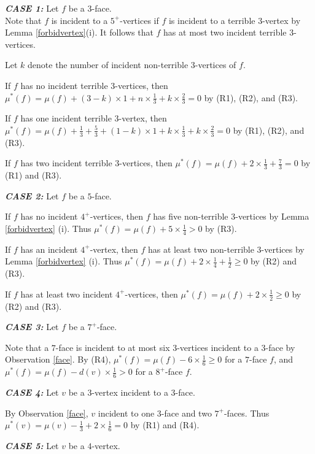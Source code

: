 \documentclass[11pt]{amsart} %
\theoremstyle{definition}
\begin{document}
\noindent\textit{\textbf{CASE 1:}} Let $f$ be a $3$-face.\\
\indent Note that $f$ is incident to a $5^+$-vertices 
if $f$ is incident to a terrible $3$-vertex 
by Lemma \ref{forbidvertex}(i). 
It follows that $f$ has at most two incident terrible $3$-vertices. 

Let $k$ denote the number of incident non-terrible 
$3$-vertices of $f.$ 

\indent  If $f$ has no incident terrible $3$-vertices,  
then $\mu^*(f)= \mu(f)+(3-k)\times1
+n\times\frac{1}{3}+k\times\frac{2}{3}=0$ 
by (R1), (R2), and (R3).

\indent  If $f$ has one incident terrible $3$-vertex,  
then $\mu^*(f)= \mu(f)+\frac{1}{3}+\frac{5}{3}+(1-k)\times1 
+k\times\frac{1}{3}+k\times\frac{2}{3}=0$ by (R1), (R2), and (R3). 

\indent  If $f$ has two incident terrible $3$-vertices,   
then $\mu^*(f)= \mu(f)+2\times\frac{1}{3}+\frac{7}{3}=0$ 
by (R1) and (R3).


\noindent\textit{\textbf{CASE 2:}} Let $f$ be a $5$-face.

\indent  If $f$ has no incident $4^+$-vertices,  
then $f$ has five non-terrible $3$-vertices 
by Lemma \ref{forbidvertex} (i). 
Thus $\mu^*(f)= \mu(f)+5\times\frac{1}{4}>0$ by (R3).

\indent  If $f$ has an incident $4^+$-vertex,  
then $f$ has at least  two non-terrible $3$-vertices 
by  Lemma \ref{forbidvertex} (i).
Thus $\mu^*(f)= \mu(f)+2\times\frac{1}{4}+\frac{1}{2}\geq 0$ by  (R2) and (R3).

\indent  If $f$ has at least two incident $4^+$-vertices, 
then $\mu^*(f)= \mu(f)+2\times\frac{1}{2}\geq 0$ by (R2) and (R3).

\noindent\textit{\textbf{CASE 3:}} Let $f$ be a $7^+$-face.

Note that a $7$-face is incident to at most six $3$-vertices 
incident to a $3$-face by Observation \ref{face}. 
By (R4), $\mu^*(f)= \mu(f)-6\times\frac{1}{6}\geq 0$ 
for a $7$-face $f$, 
and $\mu^*(f)= \mu(f)-d(v)\times\frac{1}{6}>0$ 
for a $8^+$-face $f.$ 

\noindent\textit{\textbf{CASE 4:}} 
Let $v$ be a $3$-vertex incident to a $3$-face. 

By Observation \ref{face},  
$v$ incident to one $3$-face and two $7^+$-faces. 
Thus $\mu^*(v)= \mu(v)-\frac{1}{3}+2\times\frac{1}{6}=0$ 
by  (R1) and (R4).


\noindent\textit{\textbf{CASE 5:}} Let $v$ be a $4$-vertex. 
\end{document}
